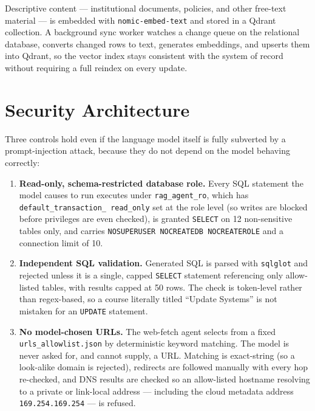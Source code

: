 \documentclass[11pt,a4paper,oneside]{report}
\begin{document}
Descriptive content --- institutional documents, policies, and other
free-text material --- is embedded with \texttt{nomic-embed-text} and stored
in a Qdrant collection. A background sync worker watches a change queue on
the relational database, converts changed rows to text, generates embeddings,
and upserts them into Qdrant, so the vector index stays consistent with the
system of record without requiring a full reindex on every update.

\section{Security Architecture}

Three controls hold even if the language model itself is fully subverted by a
prompt-injection attack, because they do not depend on the model behaving
correctly:

\begin{enumerate}
\item \textbf{Read-only, schema-restricted database role.} Every SQL
      statement the model causes to run executes under
      \texttt{rag\_agent\_ro}, which has \texttt{default\_transaction\_
      read\_only} set at the role level (so writes are blocked before
      privileges are even checked), is granted \texttt{SELECT} on 12
      non-sensitive tables only, and carries \texttt{NOSUPERUSER
      NOCREATEDB NOCREATEROLE} and a connection limit of 10.
\item \textbf{Independent SQL validation.} Generated SQL is parsed with
      \texttt{sqlglot} and rejected unless it is a single, capped
      \texttt{SELECT} statement referencing only allow-listed tables, with
      results capped at 50 rows. The check is token-level rather than
      regex-based, so a course literally titled ``Update Systems'' is not
      mistaken for an \texttt{UPDATE} statement.
\item \textbf{No model-chosen URLs.} The web-fetch agent selects from a
      fixed \texttt{urls\_allowlist.json} by deterministic keyword matching.
      The model is never asked for, and cannot supply, a URL. Matching is
      exact-string (so a look-alike domain is rejected), redirects are
      followed manually with every hop re-checked, and DNS results are
      checked so an allow-listed hostname resolving to a private or
      link-local address --- including the cloud metadata address
      \texttt{169.254.169.254} --- is refused.
\end{enumerate}
\end{document}
